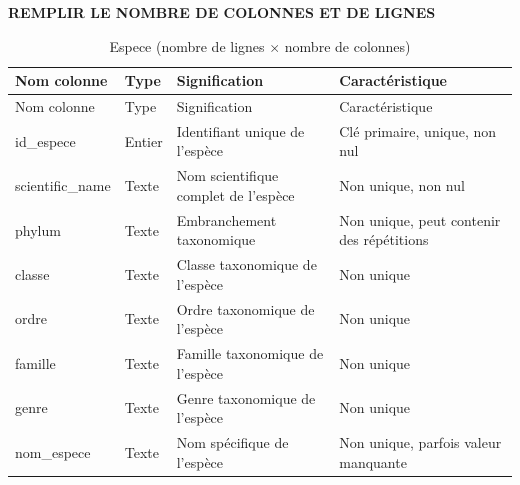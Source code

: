 \documentclass[mstat,12pt]{unswthesis}
\begin{document}
\textbf{REMPLIR LE NOMBRE DE COLONNES ET DE LIGNES}

\begingroup
\scriptsize

\begin{longtable}[]{@{}
  >{\centering\arraybackslash}p{}
  >{\centering\arraybackslash}p{}
  >{\centering\arraybackslash}p{}
  >{\centering\arraybackslash}p{}@{}}
\caption{Espece (nombre de lignes \(\times\) nombre de
colonnes)}\tabularnewline
\toprule\noalign{}
\begin{minipage}[b]{\linewidth}\centering
Nom colonne
\end{minipage} & \begin{minipage}[b]{\linewidth}\centering
Type
\end{minipage} & \begin{minipage}[b]{\linewidth}\centering
Signification
\end{minipage} & \begin{minipage}[b]{\linewidth}\centering
Caractéristique
\end{minipage} \\
\midrule\noalign{}
\endfirsthead
\toprule\noalign{}
\begin{minipage}[b]{\linewidth}\centering
Nom colonne
\end{minipage} & \begin{minipage}[b]{\linewidth}\centering
Type
\end{minipage} & \begin{minipage}[b]{\linewidth}\centering
Signification
\end{minipage} & \begin{minipage}[b]{\linewidth}\centering
Caractéristique
\end{minipage} \\
\midrule\noalign{}
\endhead
\bottomrule\noalign{}
\endlastfoot
id\_espece & Entier & Identifiant unique de l'espèce & Clé primaire,
unique, non nul \\
scientific\_name & Texte & Nom scientifique complet de l'espèce & Non
unique, non nul \\
phylum & Texte & Embranchement taxonomique & Non unique, peut contenir
des répétitions \\
classe & Texte & Classe taxonomique de l'espèce & Non unique \\
ordre & Texte & Ordre taxonomique de l'espèce & Non unique \\
famille & Texte & Famille taxonomique de l'espèce & Non unique \\
genre & Texte & Genre taxonomique de l'espèce & Non unique \\
nom\_espece & Texte & Nom spécifique de l'espèce & Non unique, parfois
valeur manquante \\
\end{longtable}
\end{document}

